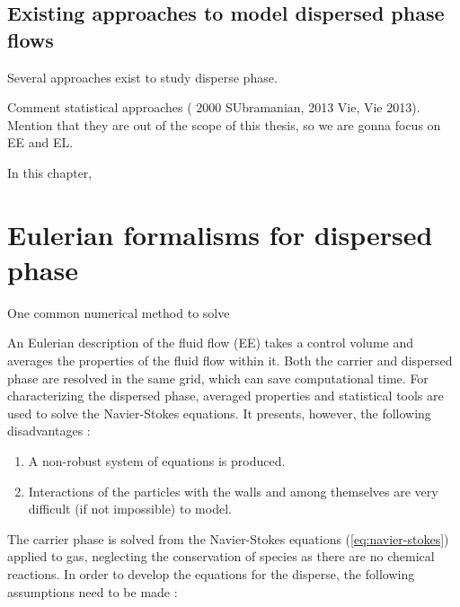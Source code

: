 \subsection{Existing approaches to model dispersed phase flows}



Several approaches exist to study disperse phase. 

Comment statistical approaches ( 2000 SUbramanian, 2013 Vie, Vie 2013). Mention that they are out of the scope of this thesis, so we are gonna focus on EE and EL.



In this chapter, 

\section{Eulerian formalisms for dispersed phase}

One common numerical method to solve

An Eulerian description of the fluid flow (EE) takes a control volume and averages the properties of the fluid flow within it. Both the carrier and dispersed phase are resolved in the same grid, which can save computational time. For characterizing the dispersed phase, averaged properties and statistical tools are used to solve the Navier-Stokes equations. It presents, however, the following disadvantages :

\begin{enumerate}

\item A non-robust system of equations is produced.

\item Interactions of the particles with the walls and among themselves are very difficult (if not impossible) to model.

\end{enumerate}

The carrier phase is solved from the Navier-Stokes equations (\ref{eq:navier-stokes}) applied to gas, neglecting the conservation of species as there are no chemical reactions. In order to develop the equations for the disperse, the following assumptions need to be made :

